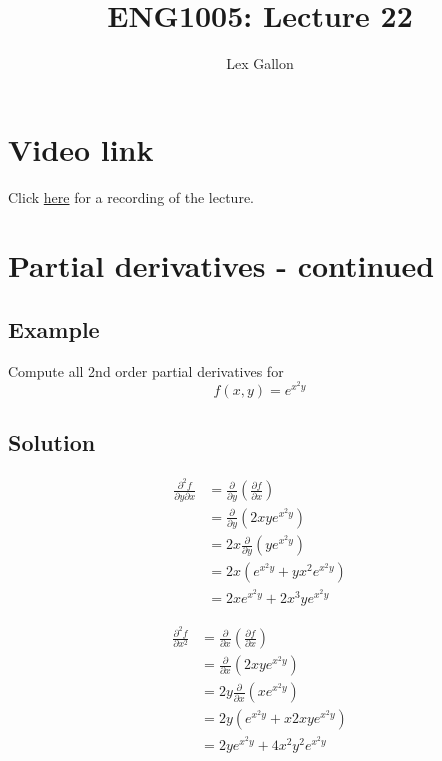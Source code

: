 \documentclass[11pt]{article}
\begin{document}
\title{ENG1005: Lecture 22}
\author{Lex Gallon}
\maketitle

\tableofcontents

\section*{Video link}
Click \href{https://echo360.org.au/lesson/G_8402119b-734b-4e1e-a3b4-7e907e86ddba_b944cecf-8ba5-40d3-a870-0243a0a9e78c_2020-05-12T15:58:00.000_2020-05-12T16:53:00.000/classroom#sortDirection=desc}{here} for a recording of the lecture.

\section{Partial derivatives - continued}
\subsection{Example}
Compute all 2nd order partial derivatives for
\[ f(x, y) = e^{x^2y} \]

\subsection{Solution}
\begin{align*}
\frac{\partial^2 f}{\partial y \partial x} &=\frac{\partial}{\partial y} \left( \frac{\partial f}{\partial x} \right) \\
&= \frac{\partial}{\partial y} \left( 2xy e^{x^2y} \right) \\
&= 2x \frac{\partial}{\partial y} \left( y e^{x^2y} \right) \\
&= 2x \left( e^{x^2y} + y x^2 e^{x^2y} \right) \\
&= 2x e^{x^2y} + 2x^3y e^{x^2y}
\end{align*}

\begin{align*}
\frac{\partial^2 f}{\partial x^2} &= \frac{\partial}{\partial x} \left( \frac{\partial f}{\partial x} \right) \\
&= \frac{\partial}{\partial x} \left( 2xy e^{x^2y} \right) \\
&= 2y \frac{\partial}{\partial x} \left( x e^{x^2y} \right) \\
&= 2y \left( e^{x^2y} + x 2xy e^{x^2y} \right) \\
&= 2y e^{x^2y} + 4x^2y^2 e^{x^2y}
\end{align*}
\end{document}
